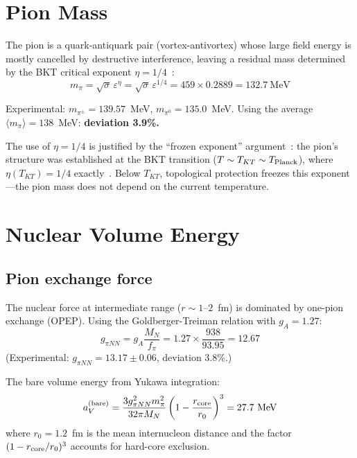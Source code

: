 ﻿\documentclass[twocolumn,showpacs,preprintnumbers,amsmath,amssymb,prc]{revtex4-2}
\begin{document}
\section{Pion Mass}
\label{sec:mpi}

The pion is a quark-antiquark pair (vortex-antivortex) whose large field energy is mostly cancelled by destructive interference, leaving a residual mass determined by the BKT critical exponent $\eta = 1/4$~\cite{Paper3}:
\begin{equation}
m_\pi = \sqrt{\sigma}\,\varepsilon^{\eta} = \sqrt{\sigma}\,\varepsilon^{1/4} = 459 \times 0.2889 = 132.7~\text{MeV}
\label{eq:mpi}
\end{equation}

Experimental: $m_{\pi^\pm} = 139.57$~MeV, $m_{\pi^0} = 135.0$~MeV. Using the average $\langle m_\pi\rangle = 138$~MeV: \textbf{deviation 3.9\%.}

The use of $\eta = 1/4$ is justified by the ``frozen exponent'' argument~\cite{Paper4}: the pion's structure was established at the BKT transition ($T \sim T_{KT} \sim T_{\rm Planck}$), where $\eta(T_{KT}) = 1/4$ exactly~\cite{Nelson1977}. Below $T_{KT}$, topological protection freezes this exponent---the pion mass does not depend on the current temperature.

\section{Nuclear Volume Energy}
\label{sec:aV}

\subsection{Pion exchange force}

The nuclear force at intermediate range ($r \sim 1$--$2$~fm) is dominated by one-pion exchange (OPEP). Using the Goldberger-Treiman relation with $g_A = 1.27$:
\begin{equation}
g_{\pi NN} = g_A \frac{M_N}{f_\pi} = 1.27 \times \frac{938}{93.95} = 12.67
\end{equation}
(Experimental: $g_{\pi NN} = 13.17 \pm 0.06$, deviation 3.8\%.)

The bare volume energy from Yukawa integration:
\begin{equation}
a_V^{(\rm bare)} = \frac{3g_{\pi NN}^2 m_\pi^2}{32\pi M_N}\left(1 - \frac{r_{\rm core}}{r_0}\right)^3 = 27.7~\text{MeV}
\end{equation}
where $r_0 = 1.2$~fm is the mean internucleon distance and the factor $(1-r_{\rm core}/r_0)^3$ accounts for hard-core exclusion.
\end{document}
